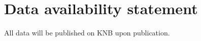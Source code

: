 \documentclass{article}\usepackage[]{graphicx}\usepackage[]{xcolor}
\begin{document}
\section*{Data availability statement}
All data will be published on KNB upon publication.


 
\end{document}
